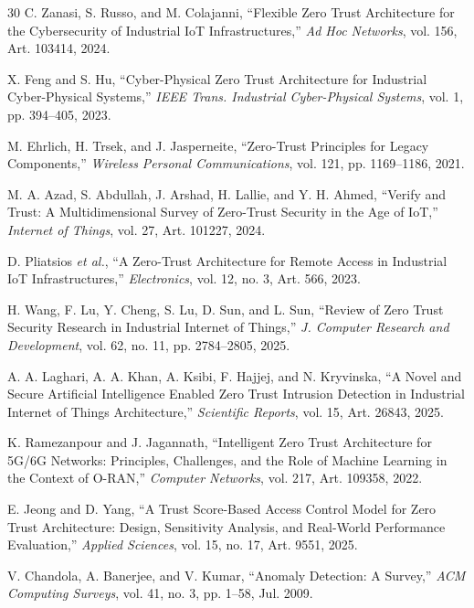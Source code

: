 \documentclass[conference]{IEEEtran}
\begin{document}
\begin{thebibliography}{30}
C. Zanasi, S. Russo, and M. Colajanni, ``Flexible Zero Trust Architecture for the Cybersecurity of Industrial IoT Infrastructures,'' \textit{Ad Hoc Networks}, vol. 156, Art. 103414, 2024.

X. Feng and S. Hu, ``Cyber-Physical Zero Trust Architecture for Industrial Cyber-Physical Systems,'' \textit{IEEE Trans. Industrial Cyber-Physical Systems}, vol. 1, pp. 394--405, 2023.

M. Ehrlich, H. Trsek, and J. Jasperneite, ``Zero-Trust Principles for Legacy Components,'' \textit{Wireless Personal Communications}, vol. 121, pp. 1169--1186, 2021.

M. A. Azad, S. Abdullah, J. Arshad, H. Lallie, and Y. H. Ahmed, ``Verify and Trust: A Multidimensional Survey of Zero-Trust Security in the Age of IoT,'' \textit{Internet of Things}, vol. 27, Art. 101227, 2024.

D. Pliatsios \textit{et al.}, ``A Zero-Trust Architecture for Remote Access in Industrial IoT Infrastructures,'' \textit{Electronics}, vol. 12, no. 3, Art. 566, 2023.

H. Wang, F. Lu, Y. Cheng, S. Lu, D. Sun, and L. Sun, ``Review of Zero Trust Security Research in Industrial Internet of Things,'' \textit{J. Computer Research and Development}, vol. 62, no. 11, pp. 2784--2805, 2025.

A. A. Laghari, A. A. Khan, A. Ksibi, F. Hajjej, and N. Kryvinska, ``A Novel and Secure Artificial Intelligence Enabled Zero Trust Intrusion Detection in Industrial Internet of Things Architecture,'' \textit{Scientific Reports}, vol. 15, Art. 26843, 2025.

K. Ramezanpour and J. Jagannath, ``Intelligent Zero Trust Architecture for 5G/6G Networks: Principles, Challenges, and the Role of Machine Learning in the Context of O-RAN,'' \textit{Computer Networks}, vol. 217, Art. 109358, 2022.

E. Jeong and D. Yang, ``A Trust Score-Based Access Control Model for Zero Trust Architecture: Design, Sensitivity Analysis, and Real-World Performance Evaluation,'' \textit{Applied Sciences}, vol. 15, no. 17, Art. 9551, 2025.

V. Chandola, A. Banerjee, and V. Kumar, ``Anomaly Detection: A Survey,'' \textit{ACM Computing Surveys}, vol. 41, no. 3, pp. 1--58, Jul. 2009.


\end{thebibliography}
\end{document}
